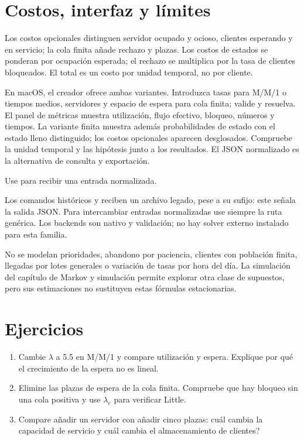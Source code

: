 \section{Costos, interfaz y límites}
Los costos opcionales distinguen servidor ocupado y ocioso, clientes esperando
y en servicio; la cola finita añade rechazo y plazas. Los costos de estados se
ponderan por ocupación esperada; el rechazo se multiplica por la tasa de
clientes bloqueados. El total es un costo por unidad temporal, no por cliente.

En macOS, el creador ofrece ambas variantes. Introduzca tasas para M/M/1 o
tiempos medios, servidores y espacio de espera para cola finita; valide y
resuelva. El panel de métricas muestra utilización, flujo efectivo, bloqueo,
números y tiempos. La variante finita muestra además probabilidades de estado
con el estado lleno distinguido; los costos opcionales aparecen desglosados.
Compruebe la unidad temporal y las hipótesis junto a los resultados. El JSON
normalizado es la alternativa de consulta y exportación.

Use  para recibir una entrada normalizada.

Los comandos históricos
 y  reciben un archivo
legado, pese a su sufijo: este señala la salida JSON. Para intercambiar entradas
normalizadas use siempre la ruta genérica. Los backends son nativo y validación;
no hay solver externo instalado para esta familia.

No se modelan prioridades, abandono por paciencia, clientes con población
finita, llegadas por lotes generales o variación de tasas por hora del día.
La simulación del capítulo de Markov y simulación permite explorar otra clase
de supuestos, pero sus estimaciones no sustituyen estas fórmulas estacionarias.

\section{Ejercicios}
\begin{enumerate}
\item Cambie \(\lambda\) a 5.5 en M/M/1 y compare utilización y espera. Explique
por qué el crecimiento de la espera no es lineal.
\item Elimine las plazas de espera de la cola finita. Compruebe que hay bloqueo
sin una cola positiva y use \(\lambda_e\) para verificar Little.
\item Compare añadir un servidor con añadir cinco plazas: \textquestiondown{}cuál cambia la
capacidad de servicio y cuál cambia el almacenamiento de clientes?
\end{enumerate}
